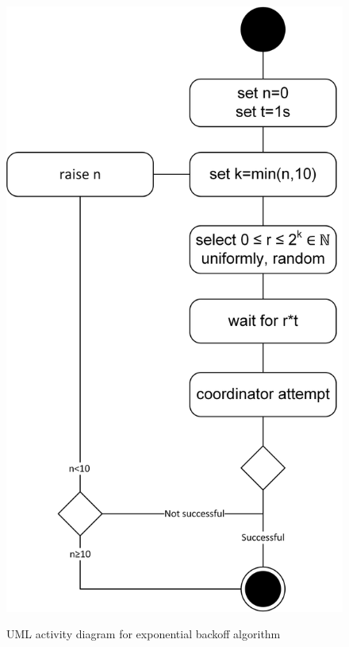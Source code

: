 		\begin{figure}[htbp] %
		\caption{\gls{UML} activity diagram for exponential backoff algorithm}
		\includegraphics[scale=0.8]{figures/exponential-backoff.png}
		\label{figure:coordinator exponential backoff}
		\end{figure}
		
		
